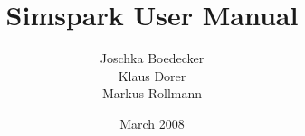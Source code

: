 

\author{Joschka Boedecker \\ Klaus Dorer \\ Markus Rollmann}
\title{Simspark User Manual}

\date{March 2008}




\setlength{\headheight}{14pt}
\setlength{\parindent}{0.7cm}

\frontmatter
\tableofcontents
\mainmatter












\backmatter




\printindex 


